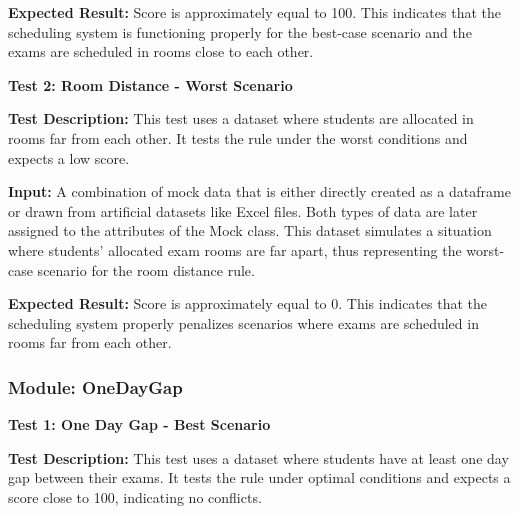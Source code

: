  
 \textbf{Expected Result:}
 Score is approximately equal to 100. This indicates that the scheduling system
is functioning properly for the best-case scenario and the exams are scheduled in rooms close to
each other.


\vspace{\baselineskip}

 
 \textbf{Test 2: Room Distance - Worst Scenario}


\vspace{\baselineskip}

 
 \textbf{Test Description:}
This test uses a dataset where students are allocated in rooms far from each
other. It tests the rule under the worst conditions and expects a low score.


\vspace{\baselineskip}


 \textbf{Input:}
 A combination of mock data that is either directly created as a dataframe or drawn from
artificial datasets like Excel files. Both types of data are later assigned to the attributes of the
Mock class. This dataset simulates a situation where students' allocated exam rooms are far
apart, thus representing the worst-case scenario for the room distance rule.


\vspace{\baselineskip}

 
 \textbf{Expected Result:}
Score is approximately equal to 0. This indicates that the scheduling system
properly penalizes scenarios where exams are scheduled in rooms far from each other.


\vspace{\baselineskip}



 \subsubsection{Module: OneDayGap}

 
\vspace{\baselineskip}


 
 \textbf{Test 1: One Day Gap - Best Scenario}


\vspace{\baselineskip}

 
 \textbf{Test Description:}
 This test uses a dataset where students have at least one day gap between
their exams. It tests the rule under optimal conditions and expects a score close to 100, indicating
no conflicts.
\vspace{\baselineskip}


